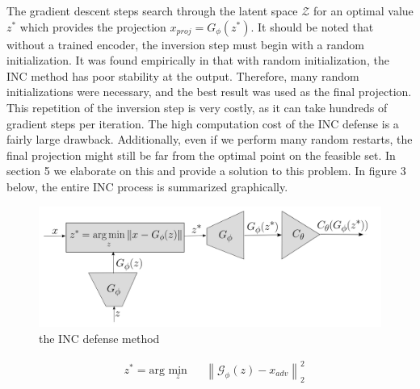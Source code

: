 \documentclass{article}
\theoremstyle{definition}
\newcommand{\norm}[2]{\left\lVert #1 \right\rVert_{#2}}
\begin{document}
The gradient descent steps search through the latent space $\mathcal{Z}$ for an optimal value $z^*$ which provides the projection $x_{proj} = G_{\phi}(z^*)$. It should be noted that without a trained encoder, the inversion step must begin with a random initialization. It was found empirically in \cite{ilyas2017} that with random initialization, the INC method has poor stability at the output. Therefore, many random initializations were necessary, and the best result was used as the final projection. This repetition of the inversion step is very costly, as it can take hundreds of gradient steps per iteration. The high computation cost of the INC defense is a fairly large drawback. Additionally, even if we perform many random restarts, the final projection might still be far from the optimal point on the feasible set. In section 5 we elaborate on this and provide a solution to this problem. In figure 3 below, the entire INC process is summarized graphically.

\begin{figure}[H]
    \centering
    \includegraphics[scale=0.25]{./INC_diagram.png}
    \caption{the INC defense method}
\end{figure}

\begin{problem}
    \begin{equation*}
    \begin{aligned}
    & z^* = \text{arg } \underset{z}{\text{min}}
    & & \norm{\mathcal{G}_{\phi}(z)-x_{adv}}{2}^2 \\
    \end{aligned}
    \end{equation*}
\end{problem}
\end{document}
